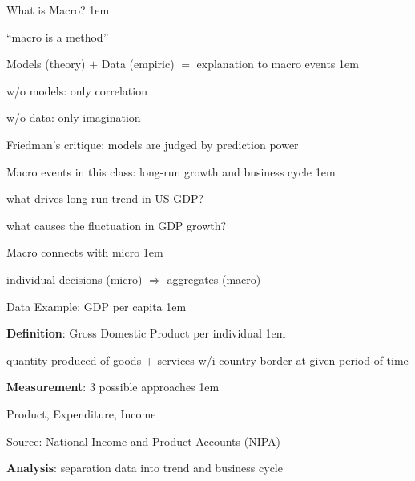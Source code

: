 \documentclass[11pt,aspectratio=43]{beamer}
\let\olditemize=\itemize
\let\endolditemize=\enditemize
\renewenvironment{itemize}{\olditemize \itemsep1em}{\endolditemize}
\theoremstyle{definition}
\begin{document}
\begin{frame}{What is Macro?}
\label{slide:What_is_Macro_}
    \begin{itemize}
        \item ``\alert{macro is a method}''
        \item Models (theory) $ + $ Data (empiric) $ = $ explanation to macro events
        \begin{itemize}
            \item w/o models: only \alert{correlation}
            \item w/o data: only \alert{imagination}
            \item \alert{Friedman's critique}: models are judged by \alert{prediction power}
        \end{itemize}
        \item Macro events in this class: \alert{long-run growth} and \alert{business cycle}
        \begin{itemize}
            \item what drives long-run trend in US GDP?
            \item what causes the fluctuation in GDP growth?
        \end{itemize}
        \item Macro connects with micro
        \begin{itemize}
            \item individual decisions (micro) $ \Rightarrow  $ aggregates (macro)
        \end{itemize}
    \end{itemize}
\end{frame}

\begin{frame}{Data Example: GDP per capita}
\label{slide:Data_Example__GDP}
    \begin{itemize}
        \item \textbf{Definition}: Gross Domestic Product \alert{per individual}
        \begin{itemize}
            \item quantity produced of \alert{goods $ + $ services} w/i country \alert{border} at given \alert{period of time}
        \end{itemize}
        \item \textbf{Measurement}: $ 3 $ possible approaches
        \begin{itemize}
            \item Product, Expenditure, Income
            \item Source: National Income and Product Accounts (NIPA)
        \end{itemize}
        \item \textbf{Analysis}: separation data into \alert{trend} and \alert{business cycle}
    \end{itemize}
\end{frame}
\end{document}
